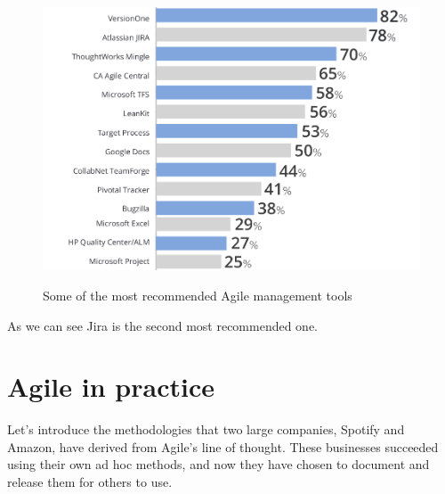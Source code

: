	\begin{figure}[H]
		\centering
		\includegraphics[width=.9\textwidth]{resources/Untitledi}\\
		\caption{Some of the most recommended Agile management tools}
	\end{figure}
	As we can see Jira is the second most recommended one.

\section{Agile in practice}
	Let's introduce the methodologies that two large companies, Spotify and Amazon, have derived from Agile's line of thought.
	These businesses succeeded using their own ad hoc methods, and now they have chosen to document and release them for others to use.
